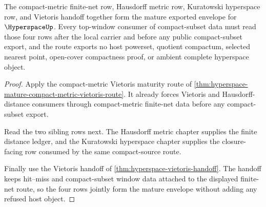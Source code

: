 \begin{theorem}
\label{thm:hyperspace-vietoris-mature-envelope}
The compact-metric finite-net row, Hausdorff metric row, Kuratowski hyperspace row, and Vietoris handoff together form the mature exported envelope for $\HyperspaceUp$. Every top-window consumer of compact-subset data must read those four rows after the local carrier and before any public compact-subset export, and the route exports no host powerset, quotient compactum, selected nearest point, open-cover compactness proof, or ambient complete hyperspace object.
\end{theorem}
\begin{proof}
Apply the compact-metric Vietoris maturity route of \autoref{thm:hyperspace-mature-compact-metric-vietoris-route}. It already forces Vietoris and Hausdorff-distance consumers through compact-metric finite-net data before any compact-subset export.

Read the two sibling rows next. The Hausdorff metric chapter supplies the finite distance ledger, and the Kuratowski hyperspace chapter supplies the closure-facing row consumed by the same compact-source route.

Finally use the Vietoris handoff of \autoref{thm:hyperspace-vietoris-handoff}. The handoff keeps hit--miss and compact-subset window data attached to the displayed finite-net route, so the four rows jointly form the mature envelope without adding any refused host object.
\end{proof}
